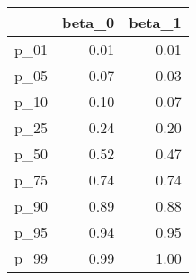 \begin{table}[ht]
\centering
\begin{tabular}{rrr}
  \hline
 & beta\_0 & beta\_1 \\ 
  \hline
p\_01 & 0.01 & 0.01 \\ 
  p\_05 & 0.07 & 0.03 \\ 
  p\_10 & 0.10 & 0.07 \\ 
  p\_25 & 0.24 & 0.20 \\ 
  p\_50 & 0.52 & 0.47 \\ 
  p\_75 & 0.74 & 0.74 \\ 
  p\_90 & 0.89 & 0.88 \\ 
  p\_95 & 0.94 & 0.95 \\ 
  p\_99 & 0.99 & 1.00 \\ 
   \hline
\end{tabular}
\end{table}
